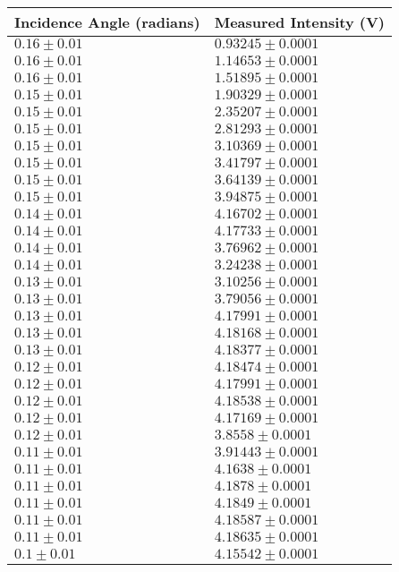 \begin{tabular}{| p{} | p{} |}
\hline
Incidence Angle (radians) & Measured Intensity (V)\\
\hline
$0.16 \pm 0.01$ & $0.93245 \pm 0.0001$\\
$0.16 \pm 0.01$ & $1.14653 \pm 0.0001$\\
$0.16 \pm 0.01$ & $1.51895 \pm 0.0001$\\
$0.15 \pm 0.01$ & $1.90329 \pm 0.0001$\\
$0.15 \pm 0.01$ & $2.35207 \pm 0.0001$\\
$0.15 \pm 0.01$ & $2.81293 \pm 0.0001$\\
$0.15 \pm 0.01$ & $3.10369 \pm 0.0001$\\
$0.15 \pm 0.01$ & $3.41797 \pm 0.0001$\\
$0.15 \pm 0.01$ & $3.64139 \pm 0.0001$\\
$0.15 \pm 0.01$ & $3.94875 \pm 0.0001$\\
$0.14 \pm 0.01$ & $4.16702 \pm 0.0001$\\
$0.14 \pm 0.01$ & $4.17733 \pm 0.0001$\\
$0.14 \pm 0.01$ & $3.76962 \pm 0.0001$\\
$0.14 \pm 0.01$ & $3.24238 \pm 0.0001$\\
$0.13 \pm 0.01$ & $3.10256 \pm 0.0001$\\
$0.13 \pm 0.01$ & $3.79056 \pm 0.0001$\\
$0.13 \pm 0.01$ & $4.17991 \pm 0.0001$\\
$0.13 \pm 0.01$ & $4.18168 \pm 0.0001$\\
$0.13 \pm 0.01$ & $4.18377 \pm 0.0001$\\
$0.12 \pm 0.01$ & $4.18474 \pm 0.0001$\\
$0.12 \pm 0.01$ & $4.17991 \pm 0.0001$\\
$0.12 \pm 0.01$ & $4.18538 \pm 0.0001$\\
$0.12 \pm 0.01$ & $4.17169 \pm 0.0001$\\
$0.12 \pm 0.01$ & $3.8558 \pm 0.0001$\\
$0.11 \pm 0.01$ & $3.91443 \pm 0.0001$\\
$0.11 \pm 0.01$ & $4.1638 \pm 0.0001$\\
$0.11 \pm 0.01$ & $4.1878 \pm 0.0001$\\
$0.11 \pm 0.01$ & $4.1849 \pm 0.0001$\\
$0.11 \pm 0.01$ & $4.18587 \pm 0.0001$\\
$0.11 \pm 0.01$ & $4.18635 \pm 0.0001$\\
$0.1 \pm 0.01$ & $4.15542 \pm 0.0001$\\
\hline
\end{tabular}\hfill
